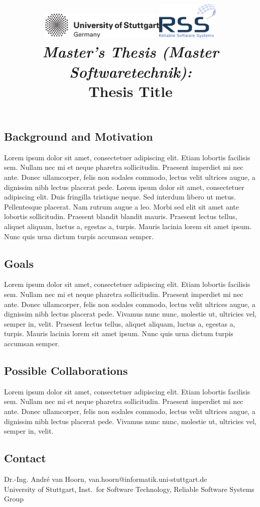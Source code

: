 \documentclass[a4paper,12pt]{article}
\date{}
\title{
\includegraphics[width=6cm]{figures/stuttgart-vector.pdf}\hfill{\includegraphics[width=3cm]{figures/rss_logo.pdf}}
\quad \\ [0.5cm]
{\large \textit{Master's Thesis (Master Softwaretechnik):}} \\ [1mm]
{\Large Thesis Title}
}
\begin{document}
	

\maketitle

\thispagestyle{empty}

\vspace{-2.5cm}


\subsection*{Background and Motivation}
Lorem ipsum dolor sit amet, consectetuer adipiscing elit. Etiam lobortis facilisis sem. Nullam nec
mi et neque pharetra sollicitudin. Praesent imperdiet mi nec ante. Donec ullamcorper, felis non
sodales commodo, lectus velit ultrices augue, a dignissim nibh lectus placerat pede. \cite{newman2015building} 
Lorem ipsum dolor sit amet, consectetuer adipiscing elit. Duis fringilla tristique neque. Sed interdum libero ut metus.
Pellentesque placerat. Nam rutrum augue a leo. Morbi sed elit sit amet ante lobortis sollicitudin.
Praesent blandit blandit mauris. Praesent lectus tellus, aliquet aliquam, luctus a, egestas a, turpis.
Mauris lacinia lorem sit amet ipsum. Nunc quis urna dictum turpis accumsan semper.


\subsection*{Goals}
Lorem ipsum dolor sit amet, consectetuer adipiscing elit. Etiam lobortis facilisis sem. Nullam nec
mi et neque pharetra sollicitudin. Praesent imperdiet mi nec ante. Donec ullamcorper, felis non
sodales commodo, lectus velit ultrices augue, a dignissim nibh lectus placerat pede. Vivamus nunc
nunc, molestie ut, ultricies vel, semper in, velit. \cite{bass2015devops} 
Praesent lectus tellus, aliquet aliquam, luctus a, egestas a, turpis.
Mauris lacinia lorem sit amet ipsum. Nunc quis urna dictum turpis accumsan semper.


\subsection*{Possible Collaborations}
Lorem ipsum dolor sit amet, consectetuer adipiscing elit. Etiam lobortis facilisis sem. Nullam nec
mi et neque pharetra sollicitudin. Praesent imperdiet mi nec ante. Donec ullamcorper, felis non
sodales commodo, lectus velit ultrices augue, a dignissim nibh lectus placerat pede. Vivamus nunc
nunc, molestie ut, ultricies vel, semper in, velit. \cite{pitakrat2016archaware}

\begin{scriptsize}


\end{scriptsize}

\subsection*{Contact}
Dr.-Ing. André van Hoorn, van.hoorn@informatik.uni-stuttgart.de \\
University of Stuttgart, Inst.\ for Software Technology, Reliable Software Systems Group \\
\end{document}
